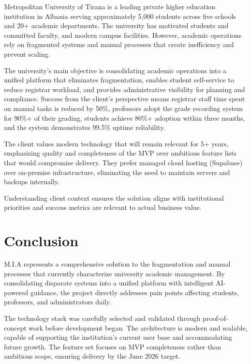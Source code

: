\documentclass[12pt,a4paper]{report}
\begin{document}
Metropolitan University of Tirana is a leading private higher education institution in Albania serving approximately 5,000 students across five schools and 20+ academic departments. The university has motivated students and committed faculty, and modern campus facilities. However, academic operations rely on fragmented systems and manual processes that create inefficiency and prevent scaling.

The university's main objective is consolidating academic operations into a unified platform that eliminates fragmentation, enables student self-service to reduce registrar workload, and provides administrative visibility for planning and compliance. Success from the client's perspective means registrar staff time spent on manual tasks is reduced by 50\%, professors adopt the grade recording system for 90\%+ of their grading, students achieve 80\%+ adoption within three months, and the system demonstrates 99.5\% uptime reliability.

The client values modern technology that will remain relevant for 5+ years, emphasizing quality and completeness of the MVP over ambitious feature lists that would compromise delivery. They prefer managed cloud hosting (Supabase) over on-premise infrastructure, eliminating the need to maintain servers and backups internally.

Understanding client context ensures the solution aligns with institutional priorities and success metrics are relevant to actual business value.

\chapter{Conclusion}

M.I.A represents a comprehensive solution to the fragmentation and manual processes that currently characterize university academic management. By consolidating disparate systems into a unified platform with intelligent AI-powered guidance, the project directly addresses pain points affecting students, professors, and administrators daily.

The technology stack was carefully selected and validated through proof-of-concept work before development began. The architecture is modern and scalable, capable of supporting the institution's current user base and accommodating future growth. The feature set focuses on MVP completeness rather than ambitious scope, ensuring delivery by the June 2026 target.
\end{document}

